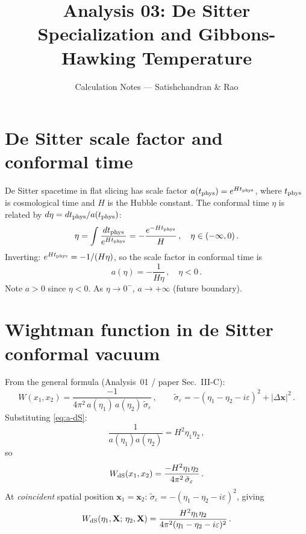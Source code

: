 \documentclass[12pt]{article}
\title{Analysis 03: De Sitter Specialization and Gibbons-Hawking Temperature}
\author{Calculation Notes --- Satishchandran \& Rao}
\date{}
\newcommand{\Scfac}{a}
\newcommand{\Wight}{W}
\begin{document}
\maketitle

\section*{De Sitter scale factor and conformal time}

De Sitter spacetime in flat slicing has scale factor $\Scfac(t_{\rm phys}) = e^{Ht_{\rm phys}}$,
where $t_{\rm phys}$ is cosmological time and $H$ is the Hubble constant.
The conformal time $\eta$ is related by $d\eta = dt_{\rm phys}/\Scfac(t_{\rm phys})$:
%
\begin{equation}
  \eta = \int \frac{dt_{\rm phys}}{e^{Ht_{\rm phys}}} = -\frac{e^{-Ht_{\rm phys}}}{H} \,,
  \quad
  \eta \in (-\infty, 0) \,.
\end{equation}
%
Inverting: $e^{Ht_{\rm phys}} = -1/(H\eta)$, so the scale factor in conformal time is
%
\begin{equation}
  \Scfac(\eta) = -\frac{1}{H\eta} \,, \quad \eta < 0 \,.
  \label{eq:a-dS}
\end{equation}
%
Note $\Scfac > 0$ since $\eta < 0$.  As $\eta \to 0^{-}$, $\Scfac \to +\infty$
(future boundary).

\section*{Wightman function in de Sitter conformal vacuum}

From the general formula (Analysis~01 / paper Sec.~III-C):
%
\begin{equation}
  \Wight(x_{1},x_{2})
  =
  \frac{-1}{4\pi^{2}\,\Scfac(\eta_{1})\,\Scfac(\eta_{2})\,\tilde{\sigma}_{\varepsilon}} \,,
  \qquad
  \tilde{\sigma}_{\varepsilon} = -(\eta_{1}-\eta_{2}-i\varepsilon)^{2}+|\Delta\mathbf{x}|^{2} \,.
\end{equation}
%
Substituting \eqref{eq:a-dS}:
%
\begin{equation}
  \frac{1}{\Scfac(\eta_{1})\Scfac(\eta_{2})} = H^{2}\eta_{1}\eta_{2} \,,
\end{equation}
%
so
%
\begin{equation}
  \Wight_{\rm dS}(x_{1},x_{2})
  =
  \frac{-H^{2}\eta_{1}\eta_{2}}{4\pi^{2}\,\tilde{\sigma}_{\varepsilon}} \,.
  \label{eq:W-dS-general}
\end{equation}
%
At \emph{coincident} spatial position $\mathbf{x}_{1}=\mathbf{x}_{2}$:
$\tilde{\sigma}_{\varepsilon} = -(\eta_{1}-\eta_{2}-i\varepsilon)^{2}$, giving
%
\begin{equation}
  \Wight_{\rm dS}(\eta_{1},\mathbf{X};\,\eta_{2},\mathbf{X})
  =
  \frac{H^{2}\eta_{1}\eta_{2}}{4\pi^{2}(\eta_{1}-\eta_{2}-i\varepsilon)^{2}} \,.
  \label{eq:W-dS-coincident}
\end{equation}
\end{document}
